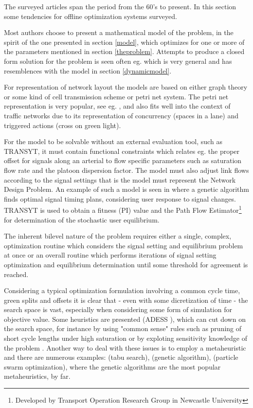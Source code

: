 \label{offline}
The surveyed articles span the period from the 60's to present. In this section some tendencies for offline optimization systems surveyed.

Most authors choose to present a mathematical model of the problem, in the spirit of the one presented in section \ref{model}, which optimizes for one or more of the parameters mentioned in section \ref{theproblem}. Attempts to produce a closed form solution for the problem is seen often eg. \cite{36} which is very general and has resemblences with the model in section \ref{dynamicmodel}.

For representation of network layout the models are based on either graph theory or some kind of cell transmission scheme or petri net system. The petri net representation is very popular, see eg. \cite{petri}, and also fits well into the context of traffic networks due to its representation of concurrency (spaces in a lane) and triggered actions (cross on green light).

For the model to be solvable without an external evaluation tool, such as TRANSYT, it must contain functional constraints which relates eg. the proper offset for signals along an arterial to flow specific parameters such as saturation flow rate and the platoon dispersion factor.
The model must also adjust link flows according to the signal settings that is the model must represent the Network Design Problem. An example of such a model is seen in \cite{33} where a genetic algorithm finds optimal signal timing plans, considering user response to signal changes. TRANSYT is used to obtain a fitness (PI) value and the Path Flow Estimator\footnote{Developed by Transport Operation Research Group in Newcastle University} for determination of the stochastic user equilibrium.

The inherent bilevel nature of the problem requires either a single, complex, optimization routine which considers the signal setting and equilibrium problem at once or an overall routine which performs iterations of signal setting optimization and equilibrium determination until some threshold for agreement is reached. 

Considering a typical optimization formulation involving a common cycle time, green splits and offsets it is clear that - even with some dicretization of time - the search space is vast, especially when considering some form of simulation for objective value. Some heuristics are presented (ADESS \cite{26}), which can cut down on the search space, for instance by using "common sense" rules such as pruning of short cycle lengths under high saturation or by exploting sensitivity knowledge of the problem \cite{40}.
Another way to deal with these issues is to employ a metaheuristic and there are numerous examples: \cite{1} (tabu search), \cite{7} (genetic algorithm), \cite{42} (particle swarm optimization), where the genetic algorithms are the most popular metaheuristics, by far.

